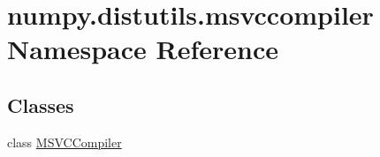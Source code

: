 \hypertarget{namespacenumpy_1_1distutils_1_1msvccompiler}{}\section{numpy.\+distutils.\+msvccompiler Namespace Reference}
\label{namespacenumpy_1_1distutils_1_1msvccompiler}
\subsection*{Classes}
\begin{DoxyCompactItemize}
\item 
class \hyperlink{classnumpy_1_1distutils_1_1msvccompiler_1_1MSVCCompiler}{M\+S\+V\+C\+Compiler}
\end{DoxyCompactItemize}
